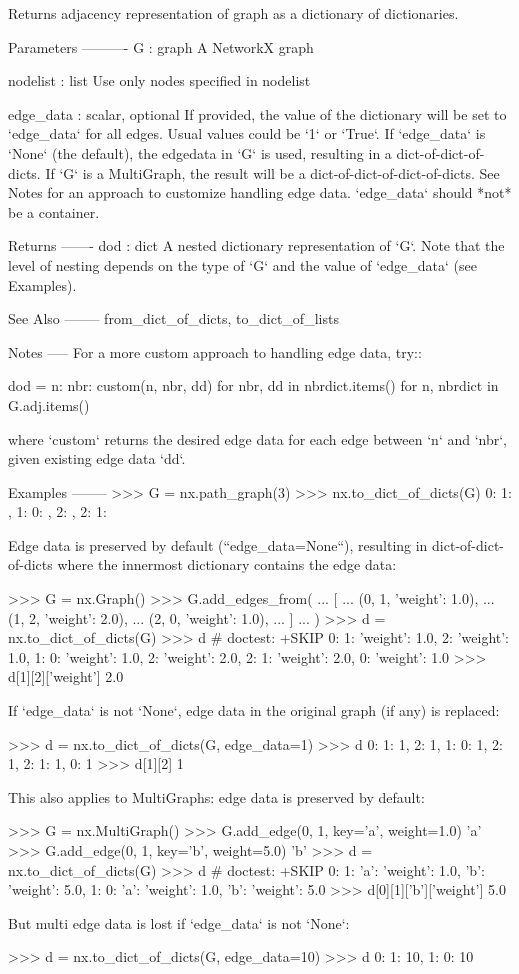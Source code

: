 \begin{DoxyVerb}Returns adjacency representation of graph as a dictionary of dictionaries.

Parameters
----------
G : graph
   A NetworkX graph

nodelist : list
   Use only nodes specified in nodelist

edge_data : scalar, optional
   If provided, the value of the dictionary will be set to `edge_data` for
   all edges. Usual values could be `1` or `True`. If `edge_data` is
   `None` (the default), the edgedata in `G` is used, resulting in a
   dict-of-dict-of-dicts. If `G` is a MultiGraph, the result will be a
   dict-of-dict-of-dict-of-dicts. See Notes for an approach to customize
   handling edge data. `edge_data` should *not* be a container.

Returns
-------
dod : dict
   A nested dictionary representation of `G`. Note that the level of
   nesting depends on the type of `G` and the value of `edge_data`
   (see Examples).

See Also
--------
from_dict_of_dicts, to_dict_of_lists

Notes
-----
For a more custom approach to handling edge data, try::

    dod = {
        n: {
            nbr: custom(n, nbr, dd) for nbr, dd in nbrdict.items()
        }
        for n, nbrdict in G.adj.items()
    }

where `custom` returns the desired edge data for each edge between `n` and
`nbr`, given existing edge data `dd`.

Examples
--------
>>> G = nx.path_graph(3)
>>> nx.to_dict_of_dicts(G)
{0: {1: {}}, 1: {0: {}, 2: {}}, 2: {1: {}}}

Edge data is preserved by default (``edge_data=None``), resulting
in dict-of-dict-of-dicts where the innermost dictionary contains the
edge data:

>>> G = nx.Graph()
>>> G.add_edges_from(
...     [
...         (0, 1, {'weight': 1.0}),
...         (1, 2, {'weight': 2.0}),
...         (2, 0, {'weight': 1.0}),
...     ]
... )
>>> d = nx.to_dict_of_dicts(G)
>>> d  # doctest: +SKIP
{0: {1: {'weight': 1.0}, 2: {'weight': 1.0}},
 1: {0: {'weight': 1.0}, 2: {'weight': 2.0}},
 2: {1: {'weight': 2.0}, 0: {'weight': 1.0}}}
>>> d[1][2]['weight']
2.0

If `edge_data` is not `None`, edge data in the original graph (if any) is
replaced:

>>> d = nx.to_dict_of_dicts(G, edge_data=1)
>>> d
{0: {1: 1, 2: 1}, 1: {0: 1, 2: 1}, 2: {1: 1, 0: 1}}
>>> d[1][2]
1

This also applies to MultiGraphs: edge data is preserved by default:

>>> G = nx.MultiGraph()
>>> G.add_edge(0, 1, key='a', weight=1.0)
'a'
>>> G.add_edge(0, 1, key='b', weight=5.0)
'b'
>>> d = nx.to_dict_of_dicts(G)
>>> d  # doctest: +SKIP
{0: {1: {'a': {'weight': 1.0}, 'b': {'weight': 5.0}}},
 1: {0: {'a': {'weight': 1.0}, 'b': {'weight': 5.0}}}}
>>> d[0][1]['b']['weight']
5.0

But multi edge data is lost if `edge_data` is not `None`:

>>> d = nx.to_dict_of_dicts(G, edge_data=10)
>>> d
{0: {1: 10}, 1: {0: 10}}
\end{DoxyVerb}
